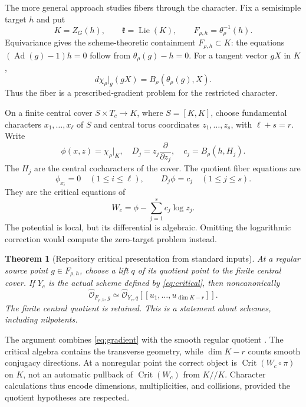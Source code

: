 \documentclass[11pt]{article}
\newcommand{\kk}{\mathfrak k}
\newcommand{\Ad}{\operatorname{Ad}}
\newcommand{\Lie}{\operatorname{Lie}}
\newcommand{\Crit}{\operatorname{Crit}}
\newtheorem{theorem}{Theorem}[section]
\begin{document}
The more general approach studies fibers through the character. Fix a semisimple target $h$ and put
\[
 K=Z_G(h),\qquad \kk=\Lie(K),\qquad F_{\rho,h}=\theta_\rho^{-1}(h).
\]
Equivariance gives the scheme-theoretic containment $F_{\rho,h}\subset K$: the equations $(\Ad(g)-1)h=0$ follow from $\theta_\rho(g)-h=0$. For a tangent vector $gX$ in $K$,
\begin{equation}\label{eq:gradient}
 d\chi_\rho|_g(gX)=B_\rho(\theta_\rho(g),X).
\end{equation}
Thus the fiber is a prescribed-gradient problem for the restricted character.

On a finite central cover $S\times T_c\to K$, where $S=[K,K]$, choose fundamental characters $x_1,\ldots,x_\ell$ of $S$ and central torus coordinates $z_1,\ldots,z_s$, with $\ell+s=r$. Write
\[
 \phi(x,z)=\chi_\rho|_K,\quad D_j=z_j\frac{\partial}{\partial z_j},
 \quad c_j=B_\rho(h,H_j).
\]
The $H_j$ are the central cocharacters of the cover. The quotient fiber equations are
\begin{equation}\label{eq:critical}
 \phi_{x_i}=0\quad(1\le i\le\ell),\qquad
 D_j\phi=c_j\quad(1\le j\le s).
\end{equation}
They are the critical equations of
\[
 W_c=\phi-\sum_{j=1}^s c_j\log z_j.
\]
The potential is local, but its differential is algebraic. Omitting the logarithmic correction would compute the zero-target problem instead.

\begin{theorem}[Repository critical presentation from standard inputs]\label{thm:critical}
At a regular source point $g\in F_{\rho,h}$, choose a lift $q$ of its quotient point to the finite central cover. If $Y_c$ is the actual scheme defined by \eqref{eq:critical}, then noncanonically
\[
 \widehat{\mathcal O}_{F_{\rho,h},g}
 \simeq \widehat{\mathcal O}_{Y_c,q}
 [[u_1,\ldots,u_{\dim K-r}]].
\]
The finite central quotient is retained. This is a statement about schemes, including nilpotents.
\end{theorem}

The argument combines \eqref{eq:gradient} with the smooth regular quotient \cite{Steinberg}. The critical algebra contains the transverse geometry, while $\dim K-r$ counts smooth conjugacy directions. At a nonregular point the correct object is $\Crit(W_c\circ\pi)$ on $K$, not an automatic pullback of $\Crit(W_c)$ from $K/\!/K$. Character calculations thus encode dimensions, multiplicities, and collisions, provided the quotient hypotheses are respected.
\end{document}
